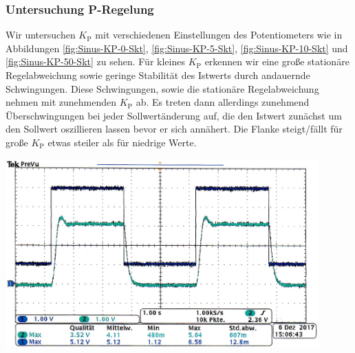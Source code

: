 \subsubsection*{Untersuchung P-Regelung}
%
Wir untersuchen $K_{\text{P}}$ mit verschiedenen Einstellungen des Potentiometers wie in Abbildungen \ref{fig:Sinus-KP-0-Skt}, \ref{fig:Sinus-KP-5-Skt}, \ref{fig:Sinus-KP-10-Skt} und \ref{fig:Sinus-KP-50-Skt} zu sehen.
Für kleines $K_{\text{P}}$ erkennen wir eine große stationäre Regelabweichung sowie geringe Stabilität des Istwerts durch andauernde Schwingungen.
Diese Schwingungen, sowie die stationäre Regelabweichung nehmen mit zunehmenden $K_{\text{P}}$ ab.
Es treten dann allerdings zunehmend Überschwingungen bei jeder Sollwertänderung auf, die den Istwert zunächst um den Sollwert oszillieren lassen bevor er sich annähert.
Die Flanke steigt/fällt für große $K_{\text{P}}$ etwas steiler als für niedrige Werte.
%
\par
%
\minipage{\linewidth}
    \begin{center}
        \captionsetup{type=figure}
        \begin{adjustbox}{max width=\linewidth, keepaspectratio}
            \includegraphics[width=120mm]{jpg/Sinus-KP-0-Skt}
        \end{adjustbox}
        \label{fig:Sinus-KP-0-Skt}
    \end{center}
\endminipage
%
\par
%
\minipage{\linewidth}
